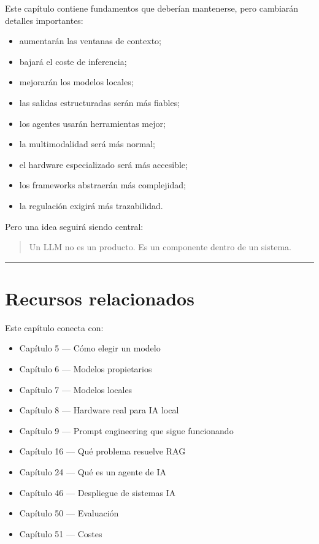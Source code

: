 Este capítulo contiene fundamentos que deberían mantenerse, pero
cambiarán detalles importantes:

\begin{itemize}
\tightlist
\item
  aumentarán las ventanas de contexto;
\item
  bajará el coste de inferencia;
\item
  mejorarán los modelos locales;
\item
  las salidas estructuradas serán más fiables;
\item
  los agentes usarán herramientas mejor;
\item
  la multimodalidad será más normal;
\item
  el hardware especializado será más accesible;
\item
  los frameworks abstraerán más complejidad;
\item
  la regulación exigirá más trazabilidad.
\end{itemize}

Pero una idea seguirá siendo central:

\begin{quote}
Un LLM no es un producto. Es un componente dentro de un sistema.
\end{quote}

\begin{center}\rule{0.5\linewidth}{0.5pt}\end{center}

\section{Recursos relacionados}\label{recursos-relacionados-3}

Este capítulo conecta con:

\begin{itemize}
\tightlist
\item
  Capítulo 5 --- Cómo elegir un modelo
\item
  Capítulo 6 --- Modelos propietarios
\item
  Capítulo 7 --- Modelos locales
\item
  Capítulo 8 --- Hardware real para IA local
\item
  Capítulo 9 --- Prompt engineering que sigue funcionando
\item
  Capítulo 16 --- Qué problema resuelve RAG
\item
  Capítulo 24 --- Qué es un agente de IA
\item
  Capítulo 46 --- Despliegue de sistemas IA
\item
  Capítulo 50 --- Evaluación
\item
  Capítulo 51 --- Costes
\end{itemize}

